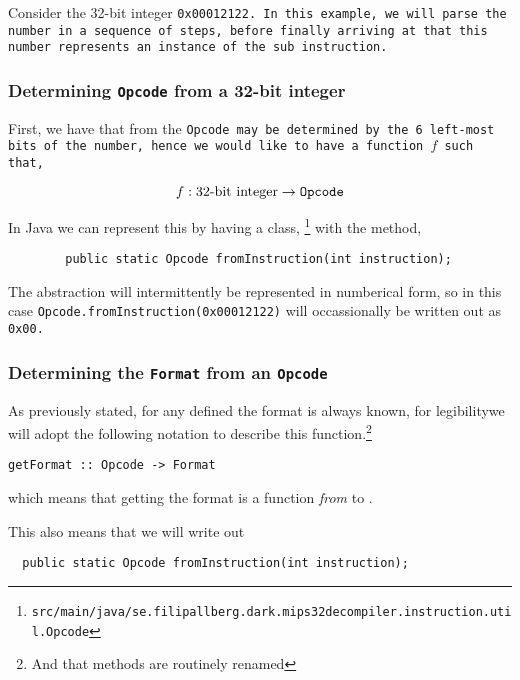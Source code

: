 Consider the 32-bit integer \tt{0x00012122}. In this example, we
will parse the number in a sequence of steps, before finally arriving
at that this number represents an instance of the \tt{sub}
instruction.

\subsubsection{Determining \texttt{Opcode} from a 32-bit integer}
First, we have that from the \tt{Opcode} may be determined
by the 6 left-most bits of the number, hence we would like to
have a function $f$ such that,

\begin{equation*}
        f: \textrm{32-bit integer} \to \tt{Opcode}
\end{equation*}

In Java we can represent this by having a class, \opcodem\footnote{
\tt{src/main/java/se.filipallberg.dark.mips32decompiler.instruction.util.Opcode}}
with the method,

\begin{verbatim}
        public static Opcode fromInstruction(int instruction);
\end{verbatim}

The \opcodem abstraction will intermittently be represented in
numberical form, so in this case \texttt{Opcode.fromInstruction(0x00012122)}
will occassionally be written out as \tt{0x00}.

\subsubsection{Determining the \texttt{Format} from an \texttt{Opcode}}

As previously stated, for any defined \opcodem the
format is always known, for legibilitywe will adopt the following
notation to describe this function.\footnote{And that methods are
routinely renamed}

\begin{verbatim}
getFormat :: Opcode -> Format
\end{verbatim}

which means that getting the format is a function \emph{from} \opcodem
to \formatm.

This also means that we will write out

\begin{verbatim}
  public static Opcode fromInstruction(int instruction);
\end{verbatim}

